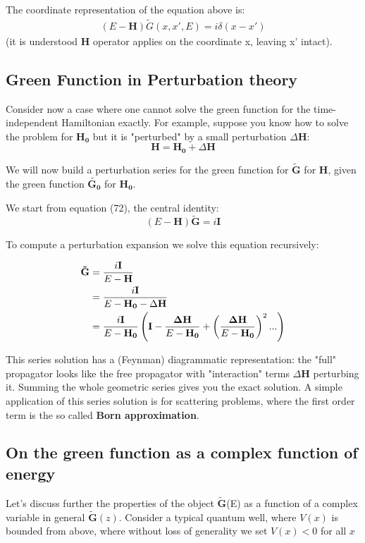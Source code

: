 \documentclass[11pt]{article}
\theoremstyle{definition}
\begin{document}
The coordinate representation of the equation above is:
\begin{align}
(E - \mathbf{H}) \tilde{G}(x, x', E) = i \delta(x - x')
\end{align}
(it is understood $\mathbf{H}$ operator applies on the coordinate x, leaving x' intact).  

\subsection{Green Function in Perturbation theory}
Consider now a case where one cannot solve the green function for the time-independent Hamiltonian exactly.  For example, suppose you know how to solve the problem for $\mathbf{H_0}$ but it is "perturbed" by a small perturbation $\Delta \mathbf{H}$:
 $$\mathbf{H} = \mathbf{H_0} + \Delta \mathbf{H}$$

We will now build a perturbation series for the green function for $\tilde{\mathbf{G}}$ for $\mathbf{H}$, given the green function $\tilde{\mathbf{G_0}}$ for $\mathbf{H_0}$.

We start from equation (72), the central identity:
$$ (E- \mathbf{H}) \mathbf{\tilde{G}} = i \mathbf{I}$$

To compute a perturbation expansion we solve this equation recursively:

\begin{align}
\mathbf{\tilde{G}} &= {i \mathbf{I} \over E - \mathbf{H}} \\
& = {i \mathbf{I} \over E - \mathbf{H_0} - \Delta \mathbf{H}} \\
& = {i \mathbf{I} \over E - \mathbf{H_0}} \left(\mathbf{I} - {\mathbf{\Delta H} \over E - \mathbf{H_0}} + \left({\mathbf{\Delta H} \over E - \mathbf{H_0}} \right)^2 ...\right)
\end{align}

This series solution has a (Feynman) diagrammatic representation: the "full" propagator looks like the free propagator with "interaction" terms $\Delta \mathbf{H}$ perturbing it.  Summing the whole geometric series gives you the exact solution.  A simple application of this series solution is for scattering problems, where the first order term is the so called \textbf{Born approximation}.

\subsection{On the green function as a complex function of energy}
\newcommand{\tG}{\mathbf{\tilde{G}}}
Let's discuss further the properties of the object $\tG$(E) as a function of a complex variable in general $\tG(z)$.  Consider a typical quantum well, where $V(x)$ is bounded from above, where without loss of generality we set $V(x) < 0$ for all $x$
\end{document}
